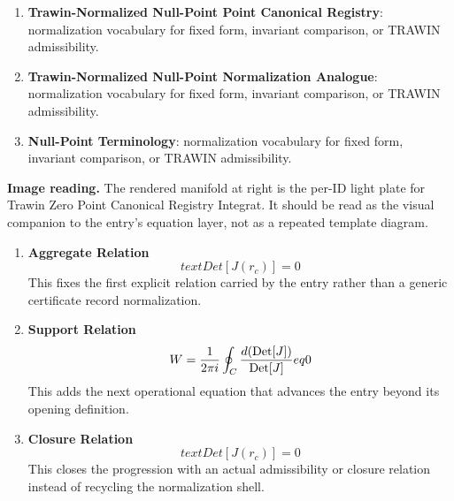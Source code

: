 \begin{enumerate}[leftmargin=1.6em,itemsep=6pt,topsep=4pt]
\item \textbf{Trawin-Normalized Null-Point Point Canonical Registry}: normalization vocabulary for fixed form, invariant comparison, or TRAWIN admissibility.
\item \textbf{Trawin-Normalized Null-Point Normalization Analogue}: normalization vocabulary for fixed form, invariant comparison, or TRAWIN admissibility.
\item \textbf{Null-Point Terminology}: normalization vocabulary for fixed form, invariant comparison, or TRAWIN admissibility.
\end{enumerate}

\begin{samepage}
\noindent\begin{minipage}[t]{0.45\linewidth}
\vspace{0pt}
\raggedright
\scriptsize\textbf{Image reading.} The rendered manifold at right is the per-ID light plate for Trawin Zero Point Canonical Registry Integrat. It should be read as the visual companion to the entry's equation layer, not as a repeated template diagram.\par
\end{minipage}\hfill
\begin{minipage}[t]{0.53\linewidth}
\vspace*{-0.10in}
\raggedright
{}
\end{minipage}
\end{samepage}

\clearpage


\begin{enumerate}[leftmargin=1.6em,itemsep=9pt,topsep=6pt]
\item \textbf{Aggregate Relation}
\[
text{Det}[J(r_c)] = 0
\]
This fixes the first explicit relation carried by the entry rather than a generic certificate record normalization.

\item \textbf{Support Relation}
\[
W = \frac{1}{2\pi i} \oint_C \frac{d(\text{Det}[J])}{{\rm Det}[J]}  eq 0
\]
This adds the next operational equation that advances the entry beyond its opening definition.

\item \textbf{Closure Relation}
\[
text{Det}[J(r_c)] = 0
\]
This closes the progression with an actual admissibility or closure relation instead of recycling the normalization shell.
\end{enumerate}

